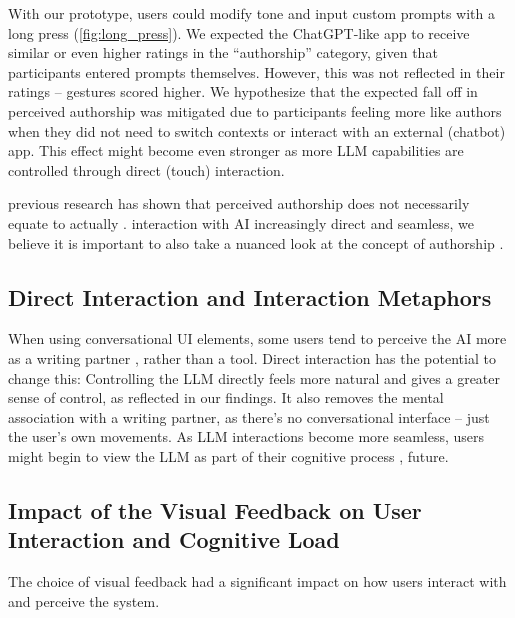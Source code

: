 With our prototype, users could modify tone and input custom prompts with a long press (\cref{fig:long_press}). 
We expected the ChatGPT-like app to receive similar or even higher ratings in the ``authorship'' category, given that participants entered prompts themselves. 
However, this was not reflected in their ratings -- gestures scored higher. 
We hypothesize that the expected fall off in perceived authorship was mitigated due to participants feeling more like authors when they did not need to switch contexts or interact with an external (chatbot) app. %
This effect might become even stronger as more LLM capabilities are controlled through direct (touch) interaction.


 previous research has shown that perceived authorship does not necessarily equate to actually  \cite{AIghostwriter2024}. 
 interaction with AI  increasingly direct and seamless, %
we believe it is important to also take a nuanced look at the concept of authorship .


\subsection{Direct Interaction and Interaction Metaphors}
When using conversational UI elements, some users tend to perceive the AI more as a writing partner \cite{diarymateKim2024, benharrak2024aipersonas}, rather than a tool. %
Direct interaction has the potential to change this: 
Controlling the LLM directly feels more natural and gives a greater sense of control, as reflected in our findings. 
It also removes the mental association with a writing partner, as there’s no conversational interface -- just the user's own movements. 
As LLM interactions become more seamless, users might begin to view the LLM as part of their cognitive process \cite{gptMeMeshi2024, bhat2023suggestionmodel},  future.







\subsection{Impact of the Visual Feedback on User Interaction and Cognitive Load}
The choice of visual feedback had a significant impact on how users interact with and perceive the system.


